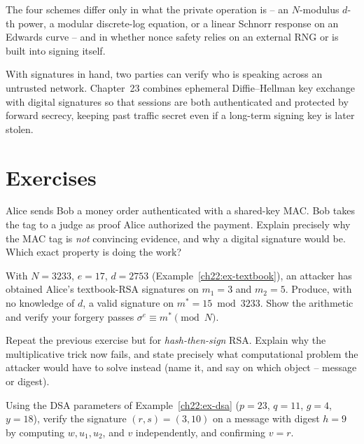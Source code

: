 The four schemes differ only in what the private operation is -- an $N$-modulus $d$-th power, a modular discrete-log equation, or a linear Schnorr response on an Edwards curve -- and in whether nonce safety relies on an external RNG or is built into signing itself.

With signatures in hand, two parties can verify who is speaking across an untrusted network.
Chapter~23 combines ephemeral Diffie--Hellman key exchange with digital signatures so that
sessions are both authenticated and protected by forward secrecy, keeping past traffic secret
even if a long-term signing key is later stolen.

\section{Exercises}
\label{ch22:exercises}

\begin{exercise}
Alice sends Bob a money order authenticated with a shared-key MAC. Bob takes the tag to a judge as proof Alice authorized the payment. Explain precisely why the MAC tag is \emph{not} convincing evidence, and why a digital signature would be. Which exact property is doing the work?
\end{exercise}

\begin{exercise}
With $N = 3233$, $e = 17$, $d = 2753$ (Example~\ref{ch22:ex-textbook}), an attacker has obtained Alice's textbook-RSA signatures on $m_1 = 3$ and $m_2 = 5$. Produce, with no knowledge of $d$, a valid signature on $m^* = 15 \bmod 3233$. Show the arithmetic and verify your forgery passes $\sigma^e \equiv m^* \pmod N$.
\end{exercise}

\begin{exercise}
Repeat the previous exercise but for \emph{hash-then-sign} RSA. Explain why the multiplicative trick now fails, and state precisely what computational problem the attacker would have to solve instead (name it, and say on which object -- message or digest).
\end{exercise}

\begin{exercise}
Using the DSA parameters of Example~\ref{ch22:ex-dsa} ($p=23$, $q=11$, $g=4$, $y=18$), verify the signature $(r,s) = (3,10)$ on a message with digest $h = 9$ by computing $w, u_1, u_2$, and $v$ independently, and confirming $v = r$.
\end{exercise}


